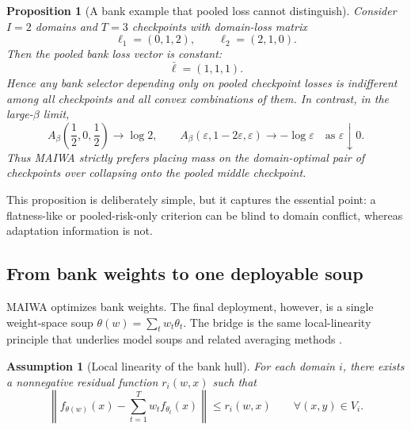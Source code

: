 \documentclass{article}
\newtheorem{proposition}{Proposition}
\newtheorem{assumption}{Assumption}
\newcommand{\maiwa}{\textup{\textsc{MAIWA}}}
\newcommand{\norm}[1]{\left\lVert #1 \right\rVert}
\begin{document}
\begin{proposition}[A bank example that pooled loss cannot distinguish]
\label{prop:separation}
Consider \(I=2\) domains and \(T=3\) checkpoints with domain-loss matrix
\begin{equation}
    \ell_1 = (0,1,2),
    \qquad
    \ell_2 = (2,1,0).
\end{equation}
Then the pooled bank loss vector is constant:
\begin{equation}
    \bar \ell = (1,1,1).
\end{equation}
Hence any bank selector depending only on pooled checkpoint losses is indifferent among all checkpoints and all convex combinations of them. In contrast, in the large-\(\beta\) limit,
\begin{equation}
    A_\beta\!\left(\frac{1}{2},0,\frac{1}{2}\right)
    \to
    \log 2,
    \qquad
    A_\beta(\varepsilon,1-2\varepsilon,\varepsilon)
    \to
    -\log \varepsilon
    \quad \text{as } \varepsilon \downarrow 0.
\end{equation}
Thus \maiwa{} strictly prefers placing mass on the domain-optimal pair of checkpoints over collapsing onto the pooled middle checkpoint.
\end{proposition}

This proposition is deliberately simple, but it captures the essential point: a flatness-like or pooled-risk-only criterion can be blind to domain conflict, whereas adaptation information is not.

\subsection{From bank weights to one deployable soup}

\maiwa{} optimizes bank weights. The final deployment, however, is a single weight-space soup \(\theta(w)=\sum_t w_t \theta_t\). The bridge is the same local-linearity principle that underlies model soups and related averaging methods \citep{wortsman2022soups}.

\begin{assumption}[Local linearity of the bank hull]
\label{ass:linearity}
For each domain \(i\), there exists a nonnegative residual function \(r_i(w,x)\) such that
\begin{equation}
    \norm{
        f_{\theta(w)}(x)
        -
        \sum_{t=1}^{T} w_t f_{\theta_t}(x)
    }
    \le r_i(w,x)
    \qquad
    \forall (x,y)\in V_i.
\end{equation}
\end{assumption}
\end{document}
